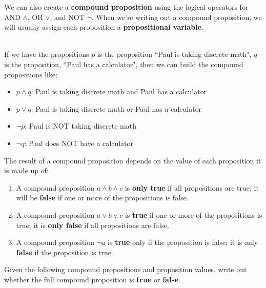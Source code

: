     \begin{introNOHEAD}{}
        We can also create a \textbf{compound proposition} using the logical operators
        for AND $\land$, OR $\lor$, and NOT $\neg$. When we're writing out
        a compound proposition, we will usually assign each proposition a
        \textbf{propositional variable}.

        ~\\ If we have the propositions
        $p$ is the proposition ``Paul is taking discrete math",
        $q$ is the proposition, ``Paul has a calculator",
        then we can build the compound propositions like:
        \begin{itemize}
            \item[] $p \land q$: Paul is taking discrete math and Paul has a calculator
            \item[] $p \lor q$: Paul is taking discrete math or Paul has a calculator
            \item[] $\neg p$: Paul is NOT taking discrete math
            \item[] $\neg q$: Paul does NOT have a calculator
        \end{itemize}

        The result of a compound proposition depends on the value of
        each proposition it is made up of:

        \begin{enumerate}
            \item A compound proposition $a \land b \land c$ is \textbf{only true}
                if all propositions are true; it will be \textbf{false} if
                one or more of the propositions is false.
            \item A compound proposition $a \lor b \lor c$ is \textbf{true}
                if one or more of the propositions is true; it is \textbf{only false}
                if all propositions are false.
            \item A compound proposition $\neg a$ is \textbf{true} only
                if the proposition is false; it is only \textbf{false} if
                the proposition is true.
        \end{enumerate}

    \end{introNOHEAD}

    \newpage

    \begin{questionNOGRADE}{\thequestion}
        Given the following compound propositions and proposition values,
        write out whether the full compound proposition is \textbf{true} or \textbf{false}.
    \end{questionNOGRADE}

